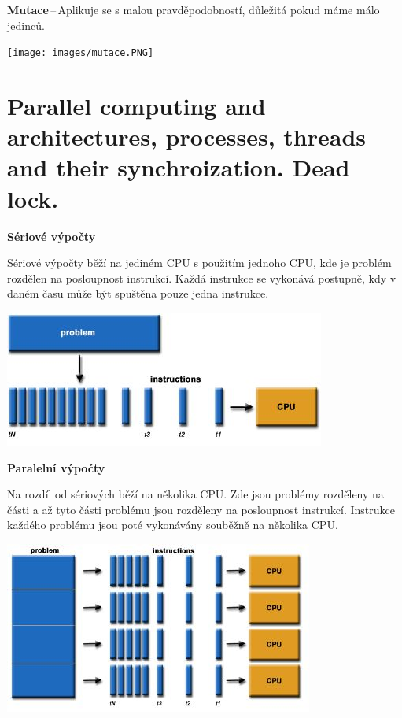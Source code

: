 \textbf{Mutace}\,--\,Aplikuje se s malou pravděpodobností, důležitá pokud máme málo jedinců.

\begin{center}
\texttt{[image: images/mutace.PNG]}
\end{center}



\section{Parallel computing and architectures, processes, threads and their synchroization. Dead lock.}
\begin{Large}\vspace{0,5cm} \textbf{Sériové výpočty}
\end{Large}

Sériové výpočty běží na jediném CPU s použitím jednoho CPU, kde je problém rozdělen na posloupnost instrukcí. Každá instrukce se vykonává postupně, kdy v daném času může být spuštěna pouze jedna instrukce.

\begin{center}
\includegraphics[scale=0.7]{images/serialComputing.JPG}
\end{center}

\begin{Large}\vspace{0,5cm} \textbf{Paralelní výpočty}
\end{Large}

Na rozdíl od sériových běží na několika CPU. Zde jsou problémy rozděleny na části a až tyto části problému jsou rozděleny na posloupnost instrukcí. Instrukce každého problému jsou poté vykonávány souběžně na několika CPU.

\begin{center}
\includegraphics[scale=0.7]{images/parallelComputing.JPG}
\end{center}

